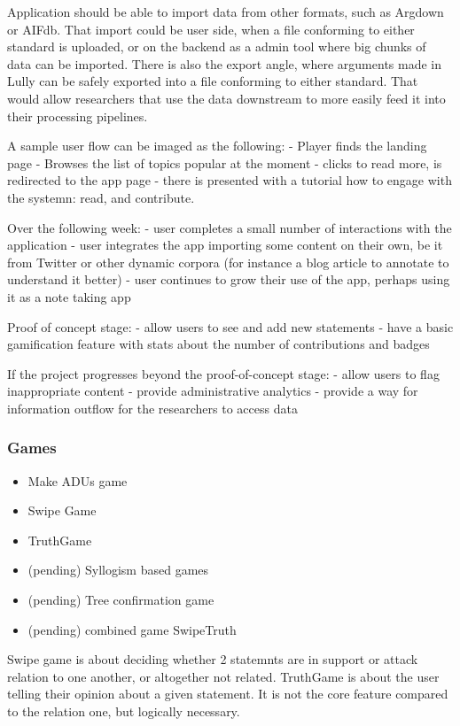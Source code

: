 \documentclass{report}
\begin{document}
Application should be able to import data from other formats, such as Argdown or AIFdb. That import could be user side, when a file conforming to either standard is uploaded, or on the backend as a admin tool where big chunks of data can be imported.
There is also the export angle, where arguments made in Lully can be safely exported into a file conforming to either standard. That would allow researchers that use the data downstream to more easily feed it into their processing pipelines.

A sample user flow can be imaged as the following:
- Player finds the landing page
- Browses the list of topics popular at the moment
- clicks to read more, is redirected to the app page
- there is presented with a tutorial how to engage with the systemn: read, and contribute.

Over the following week:
- user completes a small number of interactions with the application
- user integrates the app importing some content on their own, be it from Twitter or other dynamic corpora (for instance a blog article to annotate to understand it better)
- user continues to grow their use of the app, perhaps using it as a note taking app

Proof of concept stage:
- allow users to see and add new statements
- have a basic gamification feature with stats about the number of contributions and badges

If the project progresses beyond the proof-of-concept stage:
- allow users to flag inappropriate content
- provide administrative analytics 
- provide a way for information outflow for the researchers to access data

\subsubsection{Games}
\begin{itemize}
  \item Make ADUs game
  \item Swipe Game
  \item TruthGame 
  \item (pending) Syllogism based games
  \item (pending) Tree confirmation game
  \item (pending) combined game SwipeTruth
\end{itemize}
Swipe game is about deciding whether 2 statemnts are in support or attack relation to one another, or altogether not related.
TruthGame is about the user telling their opinion about a given statement. It is not the core feature compared to the relation one, but logically necessary.
\end{document}
